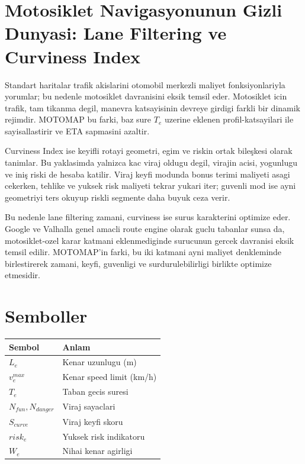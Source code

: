 ﻿\documentclass[11pt,a4paper]{article}
\begin{document}
\section{Motosiklet Navigasyonunun Gizli Dunyasi: Lane Filtering ve Curviness Index}
\noindent Standart haritalar trafik akislarini otomobil merkezli maliyet fonksiyonlariyla yorumlar; bu nedenle motosiklet davranisini eksik temsil eder. Motosiklet icin trafik, tam tikanma degil, manevra katsayisinin devreye girdigi farkli bir dinamik rejimdir. MOTOMAP bu farki, baz sure $T_e$ uzerine eklenen profil-katsayilari ile sayisallastirir ve ETA sapmasini azaltir.

\noindent Curviness Index ise keyifli rotayi geometri, egim ve riskin ortak bileşkesi olarak tanimlar. Bu yaklasimda yalnizca kac viraj oldugu degil, virajin acisi, yogunlugu ve iniş riski de hesaba katilir. Viraj keyfi modunda bonus terimi maliyeti asagi cekerken, tehlike ve yuksek risk maliyeti tekrar yukari iter; guvenli mod ise ayni geometriyi ters okuyup riskli segmente daha buyuk ceza verir.

\noindent Bu nedenle lane filtering zamani, curviness ise surus karakterini optimize eder. Google ve Valhalla genel amacli route engine olarak guclu tabanlar sunsa da, motosiklet-ozel karar katmani eklenmediginde surucunun gercek davranisi eksik temsil edilir. MOTOMAP'in farki, bu iki katmani ayni maliyet denkleminde birlestirerek zamani, keyfi, guvenligi ve surdurulebilirligi birlikte optimize etmesidir.

\section{Semboller}
\begin{center}
\begin{tabular}{@{}ll@{}}
\toprule
Sembol & Anlam \\
\midrule
$L_e$ & Kenar uzunlugu (m) \\
$v^{max}_e$ & Kenar speed limit (km/h) \\
$T_e$ & Taban gecis suresi \\
$N_{fun},N_{danger}$ & Viraj sayaclari \\
$S_{curve}$ & Viraj keyfi skoru \\
$risk_e$ & Yuksek risk indikatoru \\
$W_e$ & Nihai kenar agirligi \\
\bottomrule
\end{tabular}
\end{center}
\end{document}
